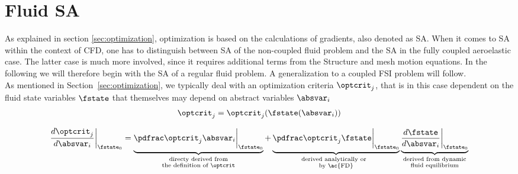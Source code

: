 \documentclass[../main.tex]{subfiles}
\begin{document}
\section{Fluid \acl{SA}}\label{sec:about}
As explained in section \ref{sec:optimization}, optimization is based on the calculations of gradients, also denoted as \acf{SA}. When it comes to \ac{SA} within the context of \ac{CFD}, one has to distinguish between \ac{SA} of the non-coupled fluid problem and the \ac{SA} in the fully coupled aeroelastic case. The latter case is much more involved, since it requires additional terms from the Structure and mesh motion equations. In the following we will therefore begin with the \ac{SA} of a regular fluid problem. A generalization to a coupled FSI problem will follow.
 \\
As mentioned in Section~\ref{sec:optimization}, we typically deal with an optimization criteria $\optcrit_j$, that is in this case dependent on the fluid state variables $\fstate$ that themselves may depend on abstract variables $\absvar_i$
\begin{align}
\optcrit_j=\optcrit_j(\fstate(\absvar_i))
\end{align}



\begin{align}
\DoptcritJBYabsvarI\bigg\rvert_{\fstate_0}=
\underbrace{\PoptcritJBYabsvarI\bigg\rvert_{\fstate_0}}_{
                                                        \substack{
                                                                 \text{directy derived from} \\
                                                                 \text{the definition of $\optcrit$}
                                                                 } 
                                                        }  +
\underbrace{\PoptcritJBYfstate\bigg\rvert_{\fstate_0}}_ {
                                                        \substack{
                                                                 \text{derived analytically or~~}\\
                                                                 \text{by \ac{FD}}
                                                                 }
                                                        }
\underbrace{\DfstateBYabsvarI\bigg\rvert_{\fstate_0}}_  {
                                                        \substack{
                                                                 \text{derived from dynamic}\\
                                                                 \text{fluid equilibrium}
                                                                 }
                                                        }
\end{align}
\end{document}
